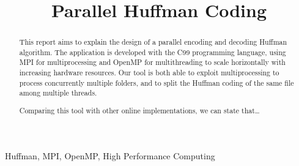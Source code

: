 \documentclass[conference]{IEEEtran}
\begin{document}
\title{Parallel Huffman Coding}

\author{
    \and
}

\maketitle

\thispagestyle{plain}
\pagestyle{plain}

\begin{abstract}
    This report aims to explain the design of a parallel encoding and decoding Huffman algorithm. The application is developed with the C99 programming language, using MPI for multiprocessing and OpenMP for multithreading to scale horizontally with increasing hardware resources. Our tool is both able to exploit multiprocessing to process concurrently multiple folders, and to split the Huffman coding of the same file among multiple threads.

    Comparing this tool with other online implementations, we can state that\dots
\end{abstract}

\begin{IEEEkeywords}
    Huffman, MPI, OpenMP, High Performance Computing
\end{IEEEkeywords}








{}

\end{document}
